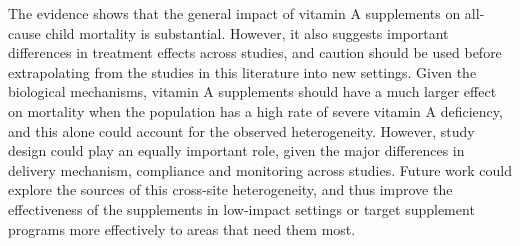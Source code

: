 \documentclass[12pt]{article}
\begin{document}
The evidence shows that the general impact of vitamin A supplements on all-cause child mortality is substantial. However, it also suggests important differences in treatment effects across studies, and caution should be used before extrapolating from the studies in this literature into new settings. Given the biological mechanisms, vitamin A supplements should have a much larger effect on mortality when the population has a high rate of severe vitamin A deficiency, and this alone could account for the observed heterogeneity. However, study design could play an equally important role, given the major differences in delivery mechanism, compliance and monitoring across studies. Future work could explore the sources of this cross-site heterogeneity, and thus improve the effectiveness of the supplements in low-impact settings or target supplement programs more effectively to areas that need them most.

\clearpage
\end{document}
